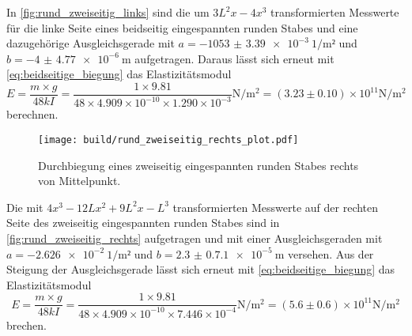 \noindent In \autoref{fig:rund_zweiseitig_links} sind die um $3L^2x-4x^3$ transformierten Messwerte für die linke Seite eines beidseitig eingespannten runden Stabes und eine dazugehörige Ausgleichsgerade mit $a=\SI{-1053(3.39)e-3}{1\per\meter²}$ und $b=\SI{-4(4.77)e-6}{\meter}$ aufgetragen.  Daraus lässt sich erneut mit \autoref{eq:beidseitige_biegung} das Elastizitätsmodul
\begin{equation*}
  E=\frac{m \times g}{48kI} = \frac{1 \times 9.81}{48 \times 4.909 \times 10^{-10} \times 1.290 \times 10^{-3}} \unit{\newton\per\meter\squared} = (3.23 \pm 0.10) \times 10^{11} \unit{\newton\per\meter\squared}
\end{equation*}
\noindent berechnen.

\begin{figure}[H]
  \centering
  \texttt{[image: build/rund\_zweiseitig\_rechts\_plot.pdf]}
  \caption{Durchbiegung eines zweiseitig eingespannten runden Stabes rechts von Mittelpunkt.}
  \label{fig:rund_zweiseitig_rechts}
\end{figure}

\noindent Die mit $4x^3-12Lx^2+9L^2x-L^3$ transformierten Messwerte auf der rechten Seite des zweiseitig eingespannten runden Stabes sind in \autoref{fig:rund_zweiseitig_rechts} aufgetragen und mit einer Ausgleichsgeraden mit $a=\SI{-2.626e-2}{1\per\meter²}$ und $b=\SI{2.3(0.71)e-5}{\meter}$ versehen.
\noindent Aus der Steigung der Ausgleichsgerade lässt sich erneut mit \autoref{eq:beidseitige_biegung} das Elastizitätsmodul
\begin{equation*}
  E=\frac{m \times g}{48kI} = \frac{1 \times 9.81}{48 \times 4.909 \times 10^{-10} \times 7.446 \times 10^{-4}} \unit{\newton\per\meter\squared} = (5.6 \pm 0.6) \times 10^{11} \unit{\newton\per\meter\squared}
\end{equation*}
\noindent brechen.